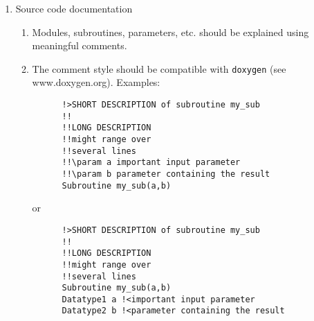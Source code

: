 \documentclass[12pt,a4paper]{article}
\begin{document}
\begin{enumerate}
  
\item Source code documentation
  \begin{enumerate}
  \item Modules, subroutines, parameters, etc. should be explained using 
    meaningful comments.
  \item The comment style should be compatible with \texttt{doxygen} 
    (see www.doxygen.org). Examples:
    \begin{verbatim}
      !>SHORT DESCRIPTION of subroutine my_sub
      !!
      !!LONG DESCRIPTION
      !!might range over
      !!several lines
      !!\param a important input parameter
      !!\param b parameter containing the result
      Subroutine my_sub(a,b)
    \end{verbatim}
    or
    \begin{verbatim}
      !>SHORT DESCRIPTION of subroutine my_sub
      !!
      !!LONG DESCRIPTION
      !!might range over
      !!several lines
      Subroutine my_sub(a,b)
      Datatype1 a !<important input parameter
      Datatype2 b !<parameter containing the result
    \end{verbatim}
    
  \end{enumerate}
\end{enumerate}
\end{document}
